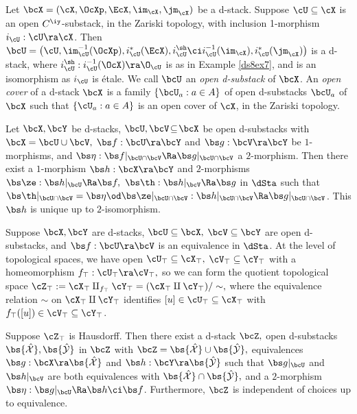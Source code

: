 \documentclass{article}
\begin{document}
\begin{dfn} Let $\bcX=(\cX,\OcXp,\EcX,\im_\cX,\jm_\cX)$ be a d-stack.
Suppose $\cU\subseteq\cX$ is an open $C^\iy$-substack, in the
Zariski topology, with inclusion 1-morphism $i_\cU:\cU\ra\cX$. Then
$\bcU=\bigl(\cU,\im_\cU^{-1}(\OcXp),i_\cU^*(\EcX),i_\cU^\sh\ci
i_\cU^{-1}(\im_\cX),i_\cU^*(\jm_\cX)\bigr)$ is a d-stack, where
$i_\cU^\sh:i_\cU^{-1}(\OcX)\ra\O_\cU$ is as in Example \ref{ds8ex7},
and is an isomorphism as $i_\cU$ is \'etale. We call $\bcU$ an {\it
open d-substack\/} of $\bcX$. An {\it
open cover\/} of a d-stack $\bcX$ is a family
$\{\bcU_a:a\in A\}$ of open d-substacks $\bcU_a$ of $\bcX$ such that
$\{\cU_a:a\in A\}$ is an open cover of $\cX$, in the Zariski
topology.
\label{ds10def2}
\end{dfn}

\begin{prop} Let\/ $\bcX,\bcY$ be d-stacks,
$\bcU,\bcV\!\subseteq\!\bcX$ be open d-substacks with\/
$\bcX=\bcU\cup\bcV,$ $\bs f:\bcU\ra\bcY$ and\/ $\bs g:\bcV\ra\bcY$
be $1$-morphisms, and\/ $\bs\eta:\bs f\vert_{\bcU\cap\bcV}\Ra\bs
g\vert_{\bcU\cap\bcV}$ a $2$-morphism. Then there exist a
$1$-morphism $\bs h:\bcX\ra\bcY$ and\/ $2$-morphisms $\bs\ze:\bs
h\vert_\bcU\Ra\bs f,$ $\bs\th:\bs h\vert_\bcV\Ra\bs g$ in $\dSta$
such that\/ $\bs\th\vert_{\bcU\cap\bcV}=
\bs\eta\od\bs\ze\vert_{\bcU\cap\bcV}:\bs h\vert_{\bcU\cap\bcV}\Ra
\bs g\vert_{\bcU\cap\bcV}$. This $\bs h$ is unique up to
$2$-isomorphism.
\label{ds10prop}
\end{prop}

\begin{thm} Suppose $\bcX,\bcY$ are d-stacks, $\bcU\subseteq\bcX,$
$\bcV\subseteq\bcY$ are open d-substacks, and\/ $\bs f:\bcU\ra\bcV$
is an equivalence in $\dSta$. At the level of topological spaces, we
have open $\cU_\top\subseteq\cX_\top,$ $\cV_\top\subseteq\cY_\top$
with a homeomorphism $f_\top:\cU_\top\ra\cV_\top,$ so we can form
the quotient topological space $\cZ_\top:=\cX_\top\amalg_{f_\top}
\cY_\top=(\cX_\top\amalg\cY_\top)/\sim,$ where the equivalence
relation $\sim$ on $\cX_\top\amalg\cY_\top$ identifies
$[u]\in\cU_\top\subseteq\cX_\top$ with\/~$f_\top([u])\in
\cV_\top\subseteq\cY_\top$.

Suppose $\cZ_\top$ is Hausdorff. Then there exist a d-stack\/
$\bcZ,$ open d-substacks\/ $\bs{\hat{\cal X}},\bs{\hat{\cal Y}}$ in
$\bcZ$ with\/ $\bcZ=\bs{\hat{\cal X}}\cup\bs{\hat{\cal Y}},$
equivalences $\bs g:\bcX\ra\bs{\hat{\cal X}}$ and\/ $\bs
h:\bcY\ra\bs{\hat{\cal Y}}$ such that\/ $\bs g\vert_\bcU$ and\/ $\bs
h\vert_\bcV$ are both equivalences with\/ $\bs{\hat{\cal
X}}\cap\bs{\hat{\cal Y}},$ and a $2$-morphism $\bs\eta:\bs
g\vert_\bcU\Ra\bs h\ci\bs f$. Furthermore, $\bcZ$ is independent of
choices up to equivalence.
\label{ds10thm4}
\end{thm}
\end{document}
